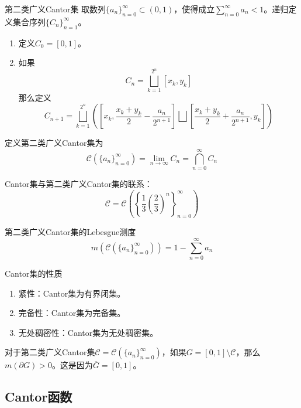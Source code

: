 \documentclass[lang = cn, scheme = chinese, thmcnt = section]{elegantbook}
\newcommand{\sub}{\subset}             %
\newcommand{\dis}{\displaystyle}
\begin{document}
\begin{definition}{第二类广义Cantor集}
	取数列$\{a_n\}_{n=0}^{\infty}\sub (0,1)$，使得成立$\dis\sum_{n=0}^{\infty}a_n<1$。递归定义集合序列$\{ C_n \}_{n=1}^{\infty}$。
	\begin{enumerate}
		\item 定义$C_0=[0,1]$。
		\item 如果%
		$$
		C_{n}=\bigsqcup_{k=1}^{2^{n}}[x_k,y_k]
		$$
		那么定义%
		$$
		C_{n+1}=\bigsqcup_{k=1}^{2^{n}}
		\left(
		\left[x_k,\frac{x_k+y_k}{2}-\frac{a_n}{2^{n+1}}\right]
		\bigsqcup
		\left[\frac{x_k+y_k}{2}+\frac{a_n}{2^{n+1}},y_k\right]
		\right)
		$$
	\end{enumerate}
	定义第二类广义Cantor集为%
	$$
	\mathcal{C}(\{a_n\}_{n=0}^{\infty})
	=\lim_{n\to\infty}C_n=\bigcap_{n=0}^{\infty}C_n
	$$
\end{definition}

\begin{note}
	Cantor集与第二类广义Cantor集的联系：%
	$$
	\mathcal{C}
	=\mathcal{C}\left(\left\{\frac{1}{3}\left(\frac{2}{3}\right)^n\right\}_{n=0}^{\infty}\right)
	$$
\end{note}

\begin{theorem}{第二类广义Cantor集的Lebesgue测度}
	$$
	m(\mathcal{C}(\{a_n\}_{n=0}^{\infty}))=1-\sum_{n=0}^{\infty}a_n
	$$
\end{theorem}

\begin{theorem}{Cantor集的性质}
	\begin{enumerate}
		\item 紧性：Cantor集为有界闭集。
		\item 完备性：Cantor集为完备集。
		\item 无处稠密性：Cantor集为无处稠密集。
	\end{enumerate}
\end{theorem}

\begin{exercise}
	对于第二类广义Cantor集$\mathcal{C}=\mathcal{C}(\{a_n\}_{n=0}^{\infty})$，如果$G=[0,1]\setminus\mathcal{C}$，那么$m(\partial G)>0$。这是因为$\overline{G}=[0,1]$。
\end{exercise}

\subsection{Cantor函数}
\end{document}
